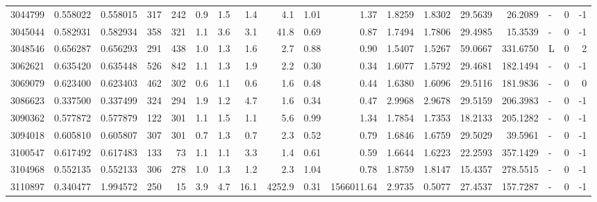 \begin{tabular}{rrrrrrrrrrrrrrrlrr}
   3044799 & 0.558022 &   0.558015 &  317 &  242 &      0.9 &      1.5 &     1.4 &      4.1 &       1.01 &        1.37 &  1.8259 &  1.8302 &   29.5639 &   26.2089 &             - &        0 &         -1 \\
   3045044 & 0.582931 &   0.582934 &  358 &  321 &      1.1 &      3.6 &     3.1 &     41.8 &       0.69 &        0.87 &  1.7494 &  1.7806 &   29.4985 &   15.3539 &             - &        0 &         -1 \\
   3048546 & 0.656287 &   0.656293 &  291 &  438 &      1.0 &      1.3 &     1.6 &      2.7 &       0.88 &        0.90 &  1.5407 &  1.5267 &   59.0667 &  331.6750 &             L &        0 &          2 \\
   3062621 & 0.635420 &   0.635448 &  526 &  842 &      1.1 &      1.3 &     1.9 &      2.2 &       0.30 &        0.34 &  1.6077 &  1.5792 &   29.4681 &  182.1494 &             - &        0 &         -1 \\
   3069079 & 0.623400 &   0.623403 &  462 &  302 &      0.6 &      1.1 &     0.6 &      1.6 &       0.48 &        0.44 &  1.6380 &  1.6096 &   29.5116 &  181.9836 &             - &        0 &          0 \\
   3086623 & 0.337500 &   0.337499 &  324 &  294 &      1.9 &      1.2 &     4.7 &      1.6 &       0.34 &        0.47 &  2.9968 &  2.9678 &   29.5159 &  206.3983 &             - &        0 &         -1 \\
   3090362 & 0.577872 &   0.577879 &  122 &  301 &      1.1 &      1.5 &     1.1 &      5.6 &       0.99 &        1.34 &  1.7854 &  1.7353 &   18.2133 &  205.1282 &             - &        0 &         -1 \\
   3094018 & 0.605810 &   0.605807 &  307 &  301 &      0.7 &      1.3 &     0.7 &      2.3 &       0.52 &        0.79 &  1.6846 &  1.6759 &   29.5029 &   39.5961 &             - &        0 &         -1 \\
   3100547 & 0.617492 &   0.617483 &  133 &   73 &      1.1 &      1.1 &     3.3 &      1.4 &       0.61 &        0.59 &  1.6644 &  1.6223 &   22.2593 &  357.1429 &             - &        0 &         -1 \\
   3104968 & 0.552135 &   0.552133 &  306 &  278 &      1.0 &      1.3 &     1.2 &      2.3 &       1.04 &        0.78 &  1.8759 &  1.8147 &   15.4357 &  278.5515 &             - &        0 &         -1 \\
   3110897 & 0.340477 &   1.994572 &  250 &   15 &      3.9 &      4.7 &    16.1 &   4252.9 &       0.31 &  1566011.64 &  2.9735 &  0.5077 &   27.4537 &  157.7287 &             - &        0 &         -1 \\

\end{tabular}
